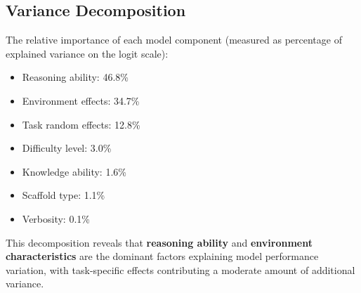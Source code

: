 \documentclass{article}
\begin{document}
\subsection{Variance Decomposition}

The relative importance of each model component (measured as percentage of explained variance on the logit scale):
\begin{itemize}
    \item Reasoning ability: 46.8\%
    \item Environment effects: 34.7\%
    \item Task random effects: 12.8\%
    \item Difficulty level: 3.0\%
    \item Knowledge ability: 1.6\%
    \item Scaffold type: 1.1\%
    \item Verbosity: 0.1\%
\end{itemize}

This decomposition reveals that \textbf{reasoning ability} and \textbf{environment characteristics} are the dominant factors explaining model performance variation, with task-specific effects contributing a moderate amount of additional variance.
\end{document}
